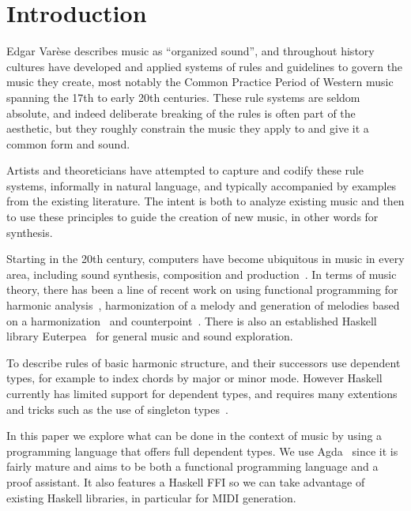 \section{Introduction}
\label{sec:intro}

Edgar Var\`{e}se describes music as ``organized sound'', and
throughout history cultures have developed and applied systems of rules
and guidelines to govern the music they create, most notably the
Common Practice Period of Western music spanning the 17th to early
20th centuries. These rule systems are seldom absolute, and indeed
deliberate breaking of the rules is often part of the aesthetic, but they
roughly constrain the music they apply to and
give it a common form and sound.

Artists and theoreticians have attempted to capture and codify these
rule systems, informally in natural language, and typically
accompanied by examples from the existing literature. The intent is
both to analyze existing music and then to use these principles to
guide the creation of new music, in other words for synthesis.

Starting in the 20th century, computers have become ubiquitous in
music in every area, including sound synthesis, composition and
production~\citep{roads-tutorial}. In terms of music theory, there has
been a line of recent work on using functional programming for
harmonic
analysis~\citep{magalhaes-harmtrace,dehaas-harmtrace-a,dehaas-harmtrace-b},
harmonization of a melody and generation of melodies based on a
harmonization~\citep{koops-fharm,magalhaes-fcomp} and
counterpoint~\citep{szamozvancev-welltyped}. There is also an
established Haskell library Euterpea~\citep{hudak-haskell} for general music
and sound exploration.

To describe rules of basic harmonic structure,
\citet{magalhaes-harmtrace} and their successors use dependent types,
for example to index chords by major or minor mode.  However Haskell
currently has limited support for dependent types, and requires many
extentions and tricks such as the use of singleton
types~\citep{eisenberg-singleton}.

In this paper we explore what can be done in the context of music by
using a programming language that offers full dependent types. We use
Agda~\citep{norell-phd} since it is fairly mature and
aims to be both a functional programming language and a proof
assistant. It also features a Haskell FFI so we can take advantage of
existing Haskell libraries, in particular for MIDI generation.

